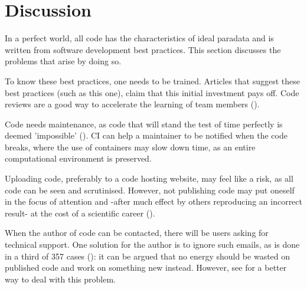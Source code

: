 \section{Discussion}

In a perfect world, all code has the characteristics of ideal paradata
and is written from software development best practices.
This section discusses the problems that arise by doing so.


To know these best practices, one needs to be trained. 
Articles that suggest these best practices (such as this one), 
claim that this initial investment pays off.
Code reviews are a good way to accelerate the 
learning of team members (\cite{vable2021code}).


Code needs maintenance,
as code that will stand the test of time perfectly 
is deemed 'impossible' (\cite{benureau2018re}).
CI can help a maintainer to be notified when the code breaks,
where the use of containers may slow down time,
as an entire computational environment is preserved.



Uploading code, preferably to a code hosting website, 
may feel like a risk, as all code can be seen and scrutinised.
However, not publishing code may put 
oneself in the focus of attention
and -after much effect by others reproducing an incorrect result-
at the cost of a scientific career (\cite{baggerly2009deriving}).


When the author of code can be contacted,
there will be users asking for technical support.
One solution for the author is to ignore such emails,
as is done in a third of 357 cases (\cite{teunis2015corresponding}):
it can be argued that no energy should be wasted on published code
and work on something new instead.
However, see \cite{barnes2010publish} for a better way to deal with this problem.

